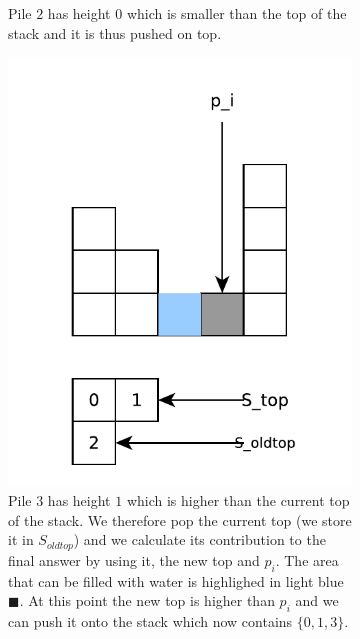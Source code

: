 \begin{figure}
\begin{subfigure}[t]{0.24\textwidth}
		\caption{Pile $2$ has height $0$ which is smaller than the top of the stack and it is thus pushed on top.}
		\label{fig:trapping_water:stack_ex3}
	 \end{subfigure}
	 \hfill
	 \begin{subfigure}[t]{0.24\textwidth}
		\includegraphics[width=1\linewidth]{sources/trapping_water/images/stack_ex4}
		\caption{Pile $3$ has height $1$ which is higher than the current top of the stack. We therefore pop the current top (we store it in $S_{oldtop}$) and we calculate its contribution to the final answer by using it, the new top and $p_i$. The area that can be filled with water is highlighed in light blue \textcolor[HTML]{99ccff}{$\blacksquare$}. At this point the new top is higher than $p_i$ and we can push it onto the stack which now contains $\{0,1,3\}$.}
		\label{fig:trapping_water:stack_ex3}
	 \end{subfigure}
	 \hspace*{-0.5in}
	 \begin{subfigure}[t]{0.24\textwidth}

\end{subfigure}
\end{figure}
